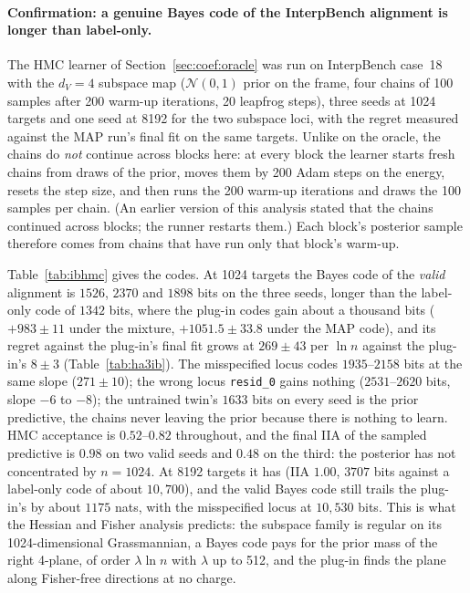 \documentclass[11pt,a4paper]{article}
\newcommand{\dv}{d_V}
\begin{document}
\paragraph{Confirmation: a genuine Bayes code of the InterpBench alignment is longer than label-only.} The HMC learner of Section~\ref{sec:coef:oracle} was run on InterpBench case~18 with the $\dv=4$ subspace map ($\mathcal N(0,1)$ prior on the frame, four chains of 100 samples after 200 warm-up iterations, 20 leapfrog steps), three seeds at 1024 targets and one seed at 8192 for the two subspace loci, with the regret measured against the MAP run's final fit on the same targets. Unlike on the oracle, the chains do \emph{not} continue across blocks here: at every block the learner starts fresh chains from draws of the prior, moves them by 200 Adam steps on the energy, resets the step size, and then runs the 200 warm-up iterations and draws the 100 samples per chain. (An earlier version of this analysis stated that the chains continued across blocks; the runner restarts them.) Each block's posterior sample therefore comes from chains that have run only that block's warm-up.

Table~\ref{tab:ibhmc} gives the codes. At 1024 targets the Bayes code of the \emph{valid} alignment is $1526$, $2370$ and $1898$ bits on the three seeds, longer than the label-only code of $1342$ bits, where the plug-in codes gain about a thousand bits ($+983\pm11$ under the mixture, $+1051.5\pm33.8$ under the MAP code), and its regret against the plug-in's final fit grows at $269\pm43$ per $\ln n$ against the plug-in's $8\pm3$ (Table~\ref{tab:ha3ib}). The misspecified locus codes $1935$--$2158$ bits at the same slope ($271\pm10$); the wrong locus \texttt{resid\_0} gains nothing ($2531$--$2620$ bits, slope $-6$ to $-8$); the untrained twin's $1633$ bits on every seed is the prior predictive, the chains never leaving the prior because there is nothing to learn. HMC acceptance is $0.52$--$0.82$ throughout, and the final IIA of the sampled predictive is $0.98$ on two valid seeds and $0.48$ on the third: the posterior has not concentrated by $n=1024$. At 8192 targets it has (IIA $1.00$, $3707$ bits against a label-only code of about $10{,}700$), and the valid Bayes code still trails the plug-in's by about $1175$ nats, with the misspecified locus at $10{,}530$ bits. This is what the Hessian and Fisher analysis predicts: the subspace family is regular on its 1024-dimensional Grassmannian, a Bayes code pays for the prior mass of the right 4-plane, of order $\lambda\ln n$ with $\lambda$ up to 512, and the plug-in finds the plane along Fisher-free directions at no charge.
\end{document}
